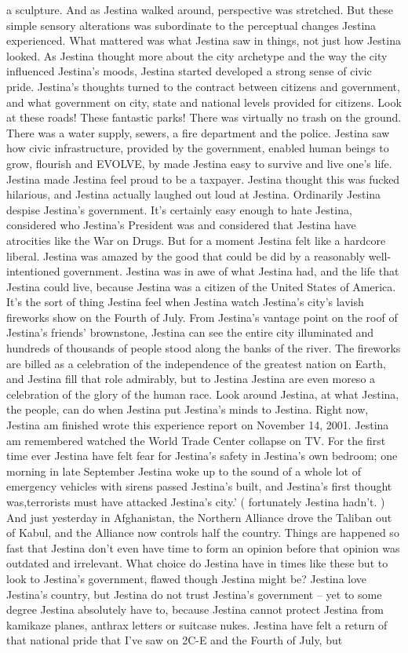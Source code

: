 \documentclass[12pt]{book}
\begin{document}
a sculpture. And as Jestina walked around, perspective was stretched. But these simple sensory alterations was subordinate to the perceptual changes Jestina experienced. What mattered was what Jestina saw in things, not just how Jestina looked. As Jestina thought more about the city archetype and the way the city influenced Jestina's moods, Jestina started developed a strong sense of civic pride. Jestina's thoughts turned to the contract between citizens and government, and what government on city, state and national levels provided for citizens. Look at these roads! These fantastic parks! There was virtually no trash on the ground. There was a water supply, sewers, a fire department and the police. Jestina saw how civic infrastructure, provided by the government, enabled human beings to grow, flourish and EVOLVE, by made Jestina easy to survive and live one's life. Jestina made Jestina feel proud to be a taxpayer. Jestina thought this was fucked hilarious, and Jestina actually laughed out loud at Jestina. Ordinarily Jestina despise Jestina's government. It's certainly easy enough to hate Jestina, considered who Jestina's President was and considered that Jestina have atrocities like the War on Drugs. But for a moment Jestina felt like a hardcore liberal. Jestina was amazed by the good that could be did by a reasonably well-intentioned government. Jestina was in awe of what Jestina had, and the life that Jestina could live, because Jestina was a citizen of the United States of America. It's the sort of thing Jestina feel when Jestina watch Jestina's city's lavish fireworks show on the Fourth of July. From Jestina's vantage point on the roof of Jestina's friends' brownstone, Jestina can see the entire city illuminated and hundreds of thousands of people stood along the banks of the river. The fireworks are billed as a celebration of the independence of the greatest nation on Earth, and Jestina fill that role admirably, but to Jestina Jestina are even moreso a celebration of the glory of the human race. Look around Jestina, at what Jestina, the people, can do when Jestina put Jestina's minds to Jestina. Right now, Jestina am finished wrote this experience report on November 14, 2001. Jestina am remembered watched the World Trade Center collapse on TV. For the first time ever Jestina have felt fear for Jestina's safety in Jestina's own bedroom; one morning in late September Jestina woke up to the sound of a whole lot of emergency vehicles with sirens passed Jestina's built, and Jestina's first thought was,terrorists must have attacked Jestina's city.' ( fortunately Jestina hadn't. ) And just yesterday in Afghanistan, the Northern Alliance drove the Taliban out of Kabul, and the Alliance now controls half the country. Things are happened so fast that Jestina don't even have time to form an opinion before that opinion was outdated and irrelevant. What choice do Jestina have in times like these but to look to Jestina's government, flawed though Jestina might be? Jestina love Jestina's country, but Jestina do not trust Jestina's government -- yet to some degree Jestina absolutely have to, because Jestina cannot protect Jestina from kamikaze planes, anthrax letters or suitcase nukes. Jestina have felt a return of that national pride that I've saw on 2C-E and the Fourth of July, but 
\end{document}
